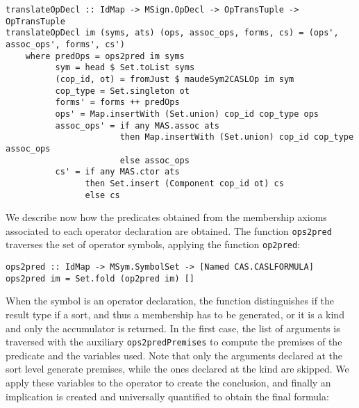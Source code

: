 {\codesize
\begin{verbatim}
translateOpDecl :: IdMap -> MSign.OpDecl -> OpTransTuple -> OpTransTuple
translateOpDecl im (syms, ats) (ops, assoc_ops, forms, cs) = (ops', assoc_ops', forms', cs')
    where predOps = ops2pred im syms
          sym = head $ Set.toList syms
          (cop_id, ot) = fromJust $ maudeSym2CASLOp im sym
          cop_type = Set.singleton ot
          forms' = forms ++ predOps
          ops' = Map.insertWith (Set.union) cop_id cop_type ops
          assoc_ops' = if any MAS.assoc ats
                       then Map.insertWith (Set.union) cop_id cop_type assoc_ops
                       else assoc_ops
          cs' = if any MAS.ctor ats
                then Set.insert (Component cop_id ot) cs
                else cs
\end{verbatim}
}

We describe now how the predicates obtained from the membership
axioms associated to each operator declaration are obtained. The function
\verb"ops2pred" traverses the set of operator symbols, applying
the function \verb"op2pred":

{\codesize
\begin{verbatim}
ops2pred :: IdMap -> MSym.SymbolSet -> [Named CAS.CASLFORMULA]
ops2pred im = Set.fold (op2pred im) []
\end{verbatim}
}

When the symbol is an operator declaration, the function distinguishes
if the result type if a sort, and thus a membership has to be generated,
or it is a kind and only the accumulator is returned. In the first
case, the list of arguments is traversed with the auxiliary
\verb"ops2predPremises" to compute the premises of the predicate
and the variables used. Note that only the arguments declared at the
sort level generate premises, while the ones declared at the kind 
are skipped. We apply these variables to the operator to create the
conclusion, and finally an implication is created and universally
quantified to obtain the final formula:

